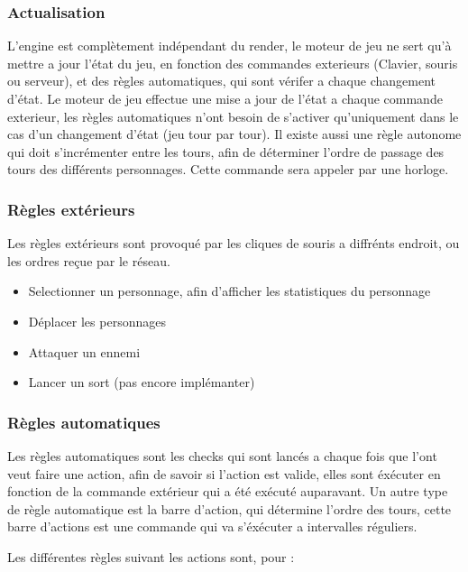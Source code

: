 \documentclass[a4paper,12pt]{article}
\begin{document}
\subsubsection{Actualisation}

L'engine est complètement indépendant du render, le moteur de jeu
ne sert qu'à mettre a jour l'état du jeu, en fonction des commandes exterieurs 
(Clavier, souris ou serveur), et des règles automatiques, qui sont vérifer a chaque 
changement d'état. Le moteur de jeu effectue une mise a jour de l'état a chaque
commande exterieur, les règles automatiques n'ont besoin de s'activer qu'uniquement 
dans le cas d'un changement d'état (jeu tour par tour). Il existe aussi une règle 
autonome qui doit s'incrémenter entre les tours, afin de déterminer l'ordre de passage
des tours des différents personnages. Cette commande sera appeler par une horloge.

\subsubsection{Règles extérieurs}

Les règles extérieurs sont provoqué par les cliques de souris a diffrénts endroit, 
ou les ordres reçue par le réseau.

\begin{itemize}
  \item Selectionner un personnage, afin d'afficher les statistiques du personnage
  \item Déplacer les personnages
  \item Attaquer un ennemi
  \item Lancer un sort (pas encore implémanter)
\end{itemize}

\subsubsection{Règles automatiques}

Les règles automatiques sont les checks qui sont lancés a chaque fois que l'ont veut faire
une action, afin de savoir si l'action est valide, elles sont éxécuter en fonction de 
la commande extérieur qui a été exécuté auparavant. Un autre type de règle automatique est 
la barre d'action, qui détermine l'ordre des tours, cette barre d'actions est une commande
qui va s'éxécuter a intervalles réguliers.

Les différentes règles suivant les actions sont, pour :
\end{document}
